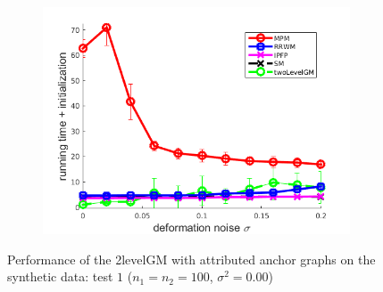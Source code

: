 \begin{figure}[h]
\begin{subfigure}[b]{0.3\textwidth}
	\end{subfigure} 
	\begin{subfigure}[b]{0.3\textwidth}
		\centering
		\includegraphics[scale=0.25]{"chapter3/fig/SyntheticTest/descr/Results_v4.3.3/Test2/time_summary_avg10t"} 
	\end{subfigure} 
	\caption[Performance of the 2levelGM with attributed anchor graphs on the synthetic data (test $1$)]{Performance of the 2levelGM with attributed anchor graphs on the synthetic data: test $1$ ($n_1=n_2=100$, $\sigma^2=0.00$)}
	\label{fig:synTest1_descr_ver433}
\end{figure}
\vspace{-10pt}
